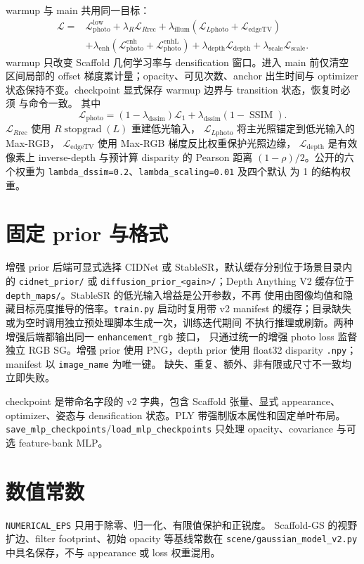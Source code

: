 \documentclass[UTF8]{ctexart}
\begin{document}
warmup 与 main 共用同一目标：
\begin{align}
\mathcal{L}={}&
\mathcal{L}^{\mathrm{low}}_{\mathrm{photo}}
+\lambda_R\mathcal{L}_{R\mathrm{rec}}
  +\lambda_{\mathrm{illum}}(\mathcal{L}_{L\mathrm{photo}}+\mathcal{L}_{\mathrm{edgeTV}})\\
&+\lambda_{\mathrm{enh}}(\mathcal{L}^{\mathrm{enh}}_{\mathrm{photo}}+
\mathcal{L}^{\mathrm{enhL}}_{\mathrm{photo}})
+\lambda_{\mathrm{depth}}\mathcal{L}_{\mathrm{depth}}
+\lambda_{\mathrm{scale}}\mathcal{L}_{\mathrm{scale}}.
\end{align}
warmup 只改变 Scaffold 几何学习率与 densification 窗口。进入 main 前仅清空
区间局部的 offset 梯度累计量；opacity、可见次数、anchor 出生时间与 optimizer
状态保持不变。checkpoint 显式保存 warmup 边界与 transition 状态，恢复时必须
与命令一致。
其中
\[
\mathcal{L}_{\mathrm{photo}}
=(1-\lambda_{\mathrm{dssim}})\mathcal{L}_1
+\lambda_{\mathrm{dssim}}(1-\operatorname{SSIM}).
\]
$\mathcal{L}_{R\mathrm{rec}}$ 使用 $R\operatorname{stopgrad}(L)$ 重建低光输入，
$\mathcal{L}_{L\mathrm{photo}}$ 将主光照锚定到低光输入的 Max-RGB，
$\mathcal{L}_{\mathrm{edgeTV}}$ 使用 Max-RGB 梯度反比权重保护光照边缘，
$\mathcal{L}_{\mathrm{depth}}$ 是有效像素上 inverse-depth 与预计算 disparity
的 Pearson 距离 $(1-\rho)/2$。公开的六个权重为
\texttt{lambda\_dssim=0.2}、\texttt{lambda\_scaling=0.01} 及四个默认
为 1 的结构权重。

\section{固定 prior 与格式}

增强 prior 后端可显式选择 CIDNet 或 StableSR，默认缓存分别位于场景目录内的
\texttt{cidnet\_prior/} 或 \texttt{diffusion\_prior\_<gain>/}；Depth Anything
V2 缓存位于 \texttt{depth\_maps/}。StableSR 的低光输入增益是公开参数，不再
使用由图像均值和隐藏目标亮度推导的倍率。\texttt{train.py} 启动时复用带 v2
manifest 的缓存；目录缺失或为空时调用独立预处理脚本生成一次，训练迭代期间
不执行推理或刷新。两种增强后端都输出同一 \texttt{enhancement\_rgb} 接口，
只通过统一的增强 photo loss 监督独立 RGB SG。增强 prior 使用 PNG，depth prior 使用
float32 disparity \texttt{.npy}；manifest 以 \texttt{image\_name} 为唯一键。
缺失、重复、额外、非有限或尺寸不一致均立即失败。

checkpoint 是带命名字段的 v2 字典，包含 Scaffold 张量、显式 appearance、
optimizer、姿态与 densification 状态。PLY 带强制版本属性和固定单叶布局。
\texttt{save\_mlp\_checkpoints}/\texttt{load\_mlp\_checkpoints} 只处理
opacity、covariance 与可选 feature-bank MLP。

\section{数值常数}

\texttt{NUMERICAL\_EPS} 只用于除零、归一化、有限值保护和正锐度。
Scaffold-GS 的视野扩边、filter footprint、初始 opacity 等基线常数在
\texttt{scene/gaussian\_model\_v2.py} 中具名保存，不与 appearance 或
loss 权重混用。
\end{document}
